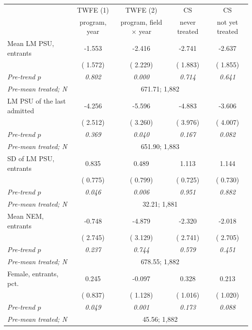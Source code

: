 \begin{tabular}{lcccc}
\toprule
 & TWFE (1) & TWFE (2) & CS & CS \\
 & program, year & program, field \(\times\) year & never treated & not yet treated \\
\midrule
Mean LM PSU, entrants &  -1.553 &  -2.416 &  -2.741 &  -2.637 \\
 & ( 1.572) & ( 2.229) & ( 1.883) & ( 1.855) \\
\quad \textit{Pre-trend \(p\)} & \textit{0.802} & \textit{0.000} & \textit{0.714} & \textit{0.641} \\
\quad \textit{Pre-mean treated; N} & \multicolumn{4}{c}{\scriptsize  671.71;  1,882} \\
\addlinespace
LM PSU of the last admitted &  -4.256 &  -5.596\sym{*} &  -4.883 &  -3.606 \\
 & ( 2.512) & ( 3.260) & ( 3.976) & ( 4.007) \\
\quad \textit{Pre-trend \(p\)} & \textit{0.369} & \textit{0.040} & \textit{0.167} & \textit{0.082} \\
\quad \textit{Pre-mean treated; N} & \multicolumn{4}{c}{\scriptsize  651.90;  1,883} \\
\addlinespace
SD of LM PSU, entrants &   0.835 &   0.489 &   1.113 &   1.144 \\
 & ( 0.775) & ( 0.799) & ( 0.725) & ( 0.730) \\
\quad \textit{Pre-trend \(p\)} & \textit{0.046} & \textit{0.006} & \textit{0.951} & \textit{0.882} \\
\quad \textit{Pre-mean treated; N} & \multicolumn{4}{c}{\scriptsize   32.21;  1,881} \\
\addlinespace
Mean NEM, entrants &  -0.748 &  -4.879 &  -2.320 &  -2.018 \\
 & ( 2.745) & ( 3.129) & ( 2.741) & ( 2.705) \\
\quad \textit{Pre-trend \(p\)} & \textit{0.237} & \textit{0.744} & \textit{0.579} & \textit{0.451} \\
\quad \textit{Pre-mean treated; N} & \multicolumn{4}{c}{\scriptsize  678.55;  1,882} \\
\addlinespace
Female, entrants, pct. &   0.245 &  -0.097 &   0.328 &   0.213 \\
 & ( 0.837) & ( 1.128) & ( 1.016) & ( 1.020) \\
\quad \textit{Pre-trend \(p\)} & \textit{0.049} & \textit{0.001} & \textit{0.173} & \textit{0.088} \\
\quad \textit{Pre-mean treated; N} & \multicolumn{4}{c}{\scriptsize   45.56;  1,882} \\

\end{tabular}
